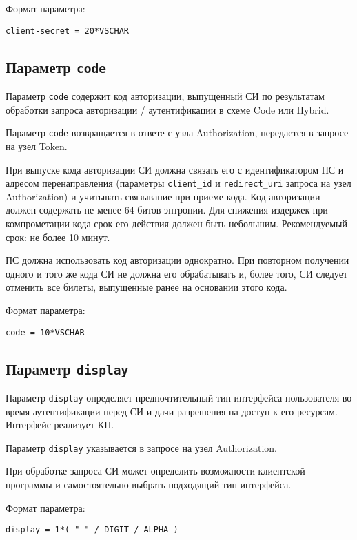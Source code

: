 Формат параметра:
\begin{lstlisting}
client-secret = 20*VSCHAR
\end{lstlisting}

\subsection{Параметр \lstinline{code}}\label{PARAMS.Code}

Параметр \lstinline{code} содержит код авторизации, выпущенный СИ
по результатам обработки запроса авторизации / аутентификации в схеме
Code или Hybrid.

Параметр \lstinline{code} возвращается в ответе с узла Authorization, 
передается в запросе на узел Token.

При выпуске кода авторизации СИ должна связать его с идентификатором ПС 
и адресом перенаправления (параметры \lstinline{client_id} и 
\lstinline{redirect_uri} запроса на узел Authorization) и учитывать 
связывание при приеме кода.
%
Код авторизации должен содержать не менее 64 битов энтропии.
%
Для снижения издержек при компрометации кода срок его действия должен быть 
небольшим.
%
Рекомендуемый срок: не более 10 минут.

ПС должна использовать код авторизации однократно. При повторном получении 
одного и того же кода СИ не должна его обрабатывать и, более того, СИ следует   
отменить все билеты, выпущенные ранее на основании этого кода.

Формат параметра:
\begin{lstlisting}
code = 10*VSCHAR
\end{lstlisting}

\subsection{Параметр \lstinline{display}}\label{PARAMS.Display}  

Параметр \lstinline{display} определяет предпочтительный тип интерфейса 
пользователя во время аутентификации перед СИ и дачи разрешения на доступ к его 
ресурсам. Интерфейс реализует КП.

Параметр \lstinline{display} указывается в запросе на узел Authorization.

При обработке запроса СИ может определить возможности клиентской программы и 
самостоятельно выбрать подходящий тип интерфейса.

Формат параметра:
\begin{lstlisting}
display = 1*( "_" / DIGIT / ALPHA )
\end{lstlisting}

